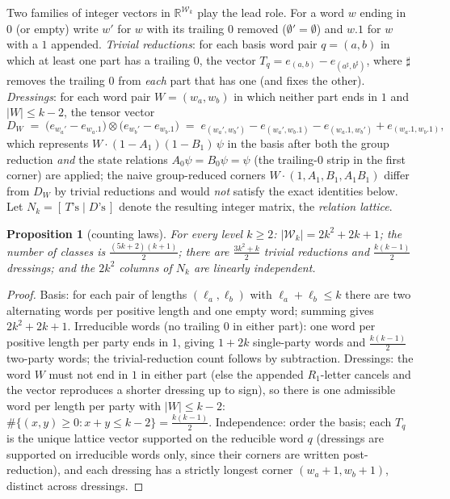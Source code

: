 \documentclass[11pt]{article}
\newtheorem{proposition}[theorem]{Proposition}
\begin{document}
Two families of integer vectors in $\mathbb R^{\mathcal W_k}$ play the lead
role. For a word $w$ ending in $0$ (or empty) write $w'$ for $w$ with its
trailing $0$ removed ($\emptyset'=\emptyset$) and $w.1$ for $w$ with a $1$
appended. \emph{Trivial reductions}: for each basis word pair $q=(a,b)$ in
which at least one part has a trailing $0$, the vector
$T_q=e_{(a,b)}-e_{(a^\sharp,b^\sharp)}$, where $\sharp$ removes the trailing
$0$ from \emph{each} part that has one (and fixes the other). \emph{Dressings}:
for each word pair $W=(w_a,w_b)$ in which neither part ends in $1$ and
$|W|\le k-2$, the tensor vector
\[
D_W\;=\;\bigl(e_{w_a'}-e_{w_a.1}\bigr)\otimes\bigl(e_{w_b'}-e_{w_b.1}\bigr)
\;=\;e_{(w_a',w_b')}-e_{(w_a',w_b.1)}-e_{(w_a.1,w_b')}+e_{(w_a.1,w_b.1)},
\]
which represents $W\!\cdot\!(1-A_1)(1-B_1)\,\psi$ in the basis after both
the group reduction \emph{and} the state relations $A_0\psi=B_0\psi=\psi$
(the trailing-$0$ strip in the first corner) are applied; the naive
group-reduced corners $W\cdot(1,A_1,B_1,A_1B_1)$ differ from $D_W$ by
trivial reductions and would \emph{not} satisfy the exact identities below.
Let $N_k=[\,T\text{'s}\mid D\text{'s}\,]$ denote the resulting integer
matrix, the \emph{relation lattice}.

\begin{proposition}[counting laws]\label{prop:count}
For every level $k\ge2$: $|\mathcal W_k|=2k^2+2k+1$; the number of classes
is $\tfrac{(5k+2)(k+1)}2$; there are $\tfrac{3k^2+k}2$ trivial reductions
and $\tfrac{k(k-1)}2$ dressings; and the $2k^2$ columns of $N_k$ are
linearly independent.
\end{proposition}

\begin{proof}
Basis: for each pair of lengths $(\ell_a,\ell_b)$ with
$\ell_a+\ell_b\le k$ there are two alternating words per positive length
and one empty word; summing gives $2k^2+2k+1$. Irreducible words (no
trailing $0$ in either part): one word per positive length per party ends
in $1$, giving $1+2k$ single-party words and $\tfrac{k(k-1)}2$ two-party
words; the trivial-reduction count follows by subtraction. Dressings: the
word $W$ must not end in $1$ in either part (else the appended $R_1$-letter
cancels and the vector reproduces a shorter dressing up to sign), so there
is one admissible word per length per party with $|W|\le k-2$:
$\#\{(x,y)\ge0:x+y\le k-2\}=\tfrac{k(k-1)}2$. Independence: order the
basis; each $T_q$ is the unique lattice vector supported on the reducible
word $q$ (dressings are supported on irreducible words only, since their
corners are written post-reduction), and each dressing has a strictly
longest corner $(w_a{+}1,w_b{+}1)$, distinct across dressings.
\end{proof}
\end{document}
